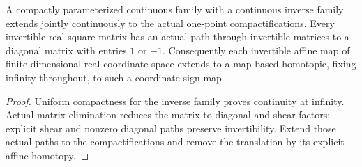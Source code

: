 \begin{proposition}
  \label{prop:actual-affine-one-point-sign-isotopy}
  \leanok
  A compactly parameterized continuous family with a continuous inverse family extends jointly continuously to the actual one-point compactifications. Every invertible real square matrix has an actual path through invertible matrices to a diagonal matrix with entries $1$ or $-1$. Consequently each invertible affine map of finite-dimensional real coordinate space extends to a map based homotopic, fixing infinity throughout, to such a coordinate-sign map.
\end{proposition}
\begin{proof}
  Uniform compactness for the inverse family proves continuity at infinity. Actual matrix elimination reduces the matrix to diagonal and shear factors; explicit shear and nonzero diagonal paths preserve invertibility. Extend those actual paths to the compactifications and remove the translation by its explicit affine homotopy.
  \leanok
\end{proof}

